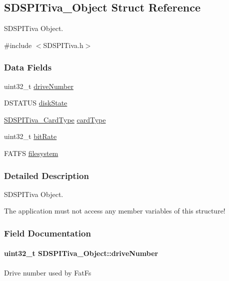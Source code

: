 \subsection{S\+D\+S\+P\+I\+Tiva\+\_\+\+Object Struct Reference}
\label{struct_s_d_s_p_i_tiva___object}


S\+D\+S\+P\+I\+Tiva Object.  




{\ttfamily \#include $<$S\+D\+S\+P\+I\+Tiva.\+h$>$}

\subsubsection*{Data Fields}
\begin{DoxyCompactItemize}
\item 
uint32\+\_\+t \hyperlink{struct_s_d_s_p_i_tiva___object_a60316454bfd57a20cbcf2d3f13f4f617}{drive\+Number}
\item 
D\+S\+T\+A\+T\+U\+S \hyperlink{struct_s_d_s_p_i_tiva___object_ad6d1084d70028145483de412f3214e4b}{disk\+State}
\item 
\hyperlink{_s_d_s_p_i_tiva_8h_a735a3f0fb087ca4e97c2e43ed68b1a0a}{S\+D\+S\+P\+I\+Tiva\+\_\+\+Card\+Type} \hyperlink{struct_s_d_s_p_i_tiva___object_aff179e7ccea883efed7d8d16f6fd9917}{card\+Type}
\item 
uint32\+\_\+t \hyperlink{struct_s_d_s_p_i_tiva___object_a1cd6cec603b463bb38884ca6b0f939cc}{bit\+Rate}
\item 
F\+A\+T\+F\+S \hyperlink{struct_s_d_s_p_i_tiva___object_a64192599a4d272f2b931c5f8a42df808}{filesystem}
\end{DoxyCompactItemize}


\subsubsection{Detailed Description}
S\+D\+S\+P\+I\+Tiva Object. 

The application must not access any member variables of this structure! 

\subsubsection{Field Documentation}
\paragraph[{drive\+Number}]{\setlength{\rightskip}{0pt plus 5cm}uint32\+\_\+t S\+D\+S\+P\+I\+Tiva\+\_\+\+Object\+::drive\+Number}\label{struct_s_d_s_p_i_tiva___object_a60316454bfd57a20cbcf2d3f13f4f617}
Drive number used by Fat\+Fs 
